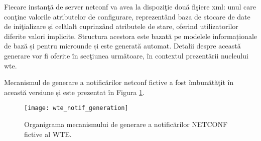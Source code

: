Fiecare instanţă de server \gls{netconf} va avea la dispoziţie două fişiere \gls{xml}: unul care conţine valorile atributelor de configurare, reprezentând baza de stocare de date de iniţializare și celălalt cuprinzând atributele de stare, oferind utilizatorilor diferite valori implicite. Structura acestora este bazată pe modelele informaționale de bază și pentru microunde și este generată automat. Detalii despre această generare vor fi oferite în secţiunea următoare, în contextul prezentării nucleului \gls{wte}.

Mecanismul de generare a notificărilor \gls{netconf} fictive a fost îmbunătăţit în această versiune și este prezentat în Figura \ref{fig:wte_notif_generation}. 

\begin{figure}[h]
	\centering
	\texttt{[image: wte\_notif\_generation]}
	\caption{Organigrama mecanismului de generare a notificărilor NETCONF fictive al WTE.}
	\label{fig:wte_notif_generation}
\end{figure}

